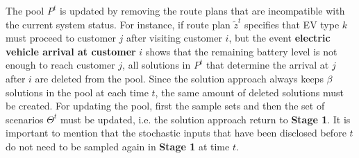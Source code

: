 \documentclass[11pt]{article}
\begin{document}
The pool $P^t$ is updated by removing the route plans that are incompatible with the current system status. For instance, if route plan $\tilde{z}^t$ specifies that EV type $k$ must proceed to customer $j$ after visiting customer $i$, but the event \textbf{electric vehicle arrival at customer} $i$ shows that the remaining battery level is not enough to reach customer $j$, all solutions in $P^t$ that determine the arrival at $j$ after $i$ are deleted from the pool. Since the solution approach always keeps $\beta$ solutions in the pool at each time $t$, the same amount of deleted solutions must be created. For updating the pool, first the sample sets and then the set of scenarios $\Theta^t$ must be updated, i.e. the solution approach return to \textbf{Stage 1}. It is important to mention that the stochastic inputs that have been disclosed before $t$ do not need to be sampled again in \textbf{Stage 1} at time $t$. 

\end{document}
